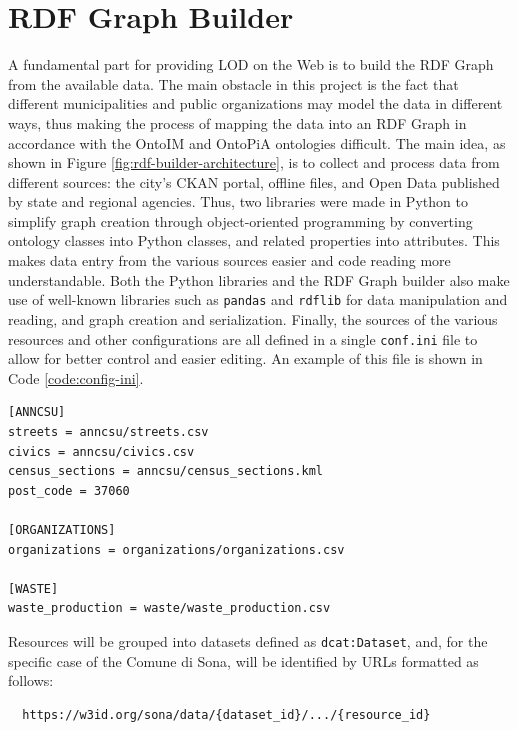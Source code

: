 \chapter{RDF Graph Builder}
\label{chp:rdf-builder}

A fundamental part for providing \acl{LOD} on the Web is to build the \ac{RDF} Graph from the available data. The main obstacle in this project is the fact that different municipalities and public organizations may model the data in different ways, thus making the process of mapping the data into an \ac{RDF} Graph in accordance with the \ac{OntoIM} and OntoPiA ontologies difficult. The main idea, as shown in Figure \ref{fig:rdf-builder-architecture}, is to collect and process data from different sources: the city's CKAN portal, offline files, and Open Data published by state and regional agencies. Thus, two libraries were made in Python to simplify graph creation through object-oriented programming by converting ontology classes into Python classes, and related properties into attributes. This makes data entry from the various sources easier and code reading more understandable. Both the Python libraries and the \ac{RDF} Graph builder also make use of well-known libraries such as \verb#pandas# and \verb#rdflib# for data manipulation and reading, and graph creation and serialization. Finally, the sources of the various resources and other configurations are all defined in a single \verb#conf.ini# file to allow for better control and easier editing. An example of this file is shown in Code \ref{code:config-ini}.

\begin{lstlisting}[language=bash,caption={Example of a config.ini file that defines sources for some semantic areas.},label=code:config-ini]
[ANNCSU]
streets = anncsu/streets.csv
civics = anncsu/civics.csv
census_sections = anncsu/census_sections.kml
post_code = 37060

[ORGANIZATIONS]
organizations = organizations/organizations.csv

[WASTE]
waste_production = waste/waste_production.csv
\end{lstlisting}

Resources will be grouped into datasets defined as \verb#dcat:Dataset#, and, for the specific case of the Comune di Sona, will be identified by \acp{URL} formatted as follows:

\begin{verbatim}
  https://w3id.org/sona/data/{dataset_id}/.../{resource_id}
\end{verbatim}

